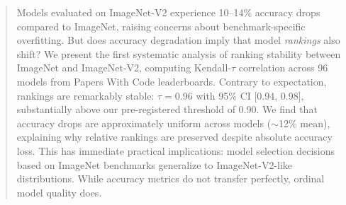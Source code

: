 \begin{abstract}
Models evaluated on ImageNet-V2 experience 10--14\% accuracy drops compared to ImageNet, raising concerns about benchmark-specific overfitting. But does accuracy degradation imply that model \emph{rankings} also shift? We present the first systematic analysis of ranking stability between ImageNet and ImageNet-V2, computing Kendall-$\tau$ correlation across 96 models from Papers With Code leaderboards. Contrary to expectation, rankings are remarkably stable: $\tau = 0.96$ with 95\% CI [0.94, 0.98], substantially above our pre-registered threshold of 0.90. We find that accuracy drops are approximately uniform across models ($\sim$12\% mean), explaining why relative rankings are preserved despite absolute accuracy loss. This has immediate practical implications: model selection decisions based on ImageNet benchmarks generalize to ImageNet-V2-like distributions. While accuracy metrics do not transfer perfectly, ordinal model quality does.
\end{abstract}
